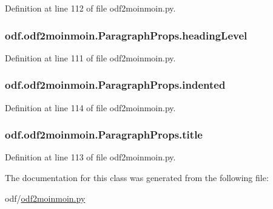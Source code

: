 Definition at line 112 of file odf2moinmoin.\+py.

\hypertarget{classodf_1_1odf2moinmoin_1_1ParagraphProps_add02ed417452383ebb8ba0ab6970d4e0}{
\subsubsection[{heading\+Level}]{\setlength{\rightskip}{0pt plus 5cm}odf.\+odf2moinmoin.\+Paragraph\+Props.\+heading\+Level}}\label{classodf_1_1odf2moinmoin_1_1ParagraphProps_add02ed417452383ebb8ba0ab6970d4e0}


Definition at line 111 of file odf2moinmoin.\+py.

\hypertarget{classodf_1_1odf2moinmoin_1_1ParagraphProps_a2146e406f9b893c7040a8e403a22ccb3}{
\subsubsection[{indented}]{\setlength{\rightskip}{0pt plus 5cm}odf.\+odf2moinmoin.\+Paragraph\+Props.\+indented}}\label{classodf_1_1odf2moinmoin_1_1ParagraphProps_a2146e406f9b893c7040a8e403a22ccb3}


Definition at line 114 of file odf2moinmoin.\+py.

\hypertarget{classodf_1_1odf2moinmoin_1_1ParagraphProps_a93af567c9a73f9a410d228c7c4c6af3c}{
\subsubsection[{title}]{\setlength{\rightskip}{0pt plus 5cm}odf.\+odf2moinmoin.\+Paragraph\+Props.\+title}}\label{classodf_1_1odf2moinmoin_1_1ParagraphProps_a93af567c9a73f9a410d228c7c4c6af3c}


Definition at line 113 of file odf2moinmoin.\+py.



The documentation for this class was generated from the following file\+:\begin{DoxyCompactItemize}
\item 
odf/\hyperlink{odf2moinmoin_8py}{odf2moinmoin.\+py}\end{DoxyCompactItemize}
